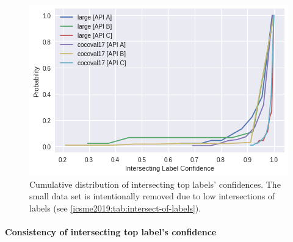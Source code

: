 \begin{table}[t!]
\caption[Evolution of top labels and confidence values]{Ratio of the top labels (to images) that remained the top label but changed confidence values between intervals.}
\label{icsme2019:tab:delta-confidences}
\centering
{}
\end{table}


\begin{figure}
  \centering
  \includegraphics[width=0.75\linewidth]{intersecting-cdf}
  \caption[Cumulative distribution of intersecting top label confidences]{Cumulative distribution of intersecting top labels' confidences. The small data set is intentionally removed due to low intersections of labels (see \cref{icsme2019:tab:intersect-of-labels}).}
  \label{icsme2019:fig:intersecting-cdf}
\end{figure}

\paragraph{Consistency of intersecting top label's confidence}

